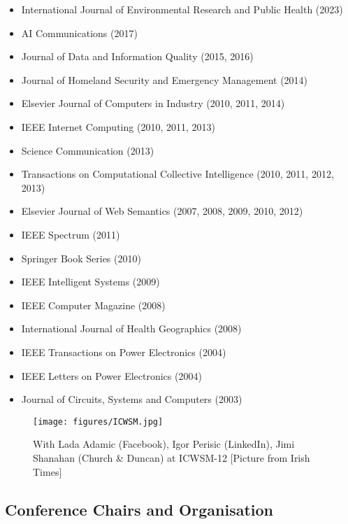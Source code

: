 \documentclass[10pt,a4paper]{res} %
\begin{document}
\begin{resume}
\begin{itemize} \itemsep -2pt
\item International Journal of Environmental Research and Public Health (2023)
\item AI Communications (2017)
\item Journal of Data and Information Quality (2015, 2016)
\item Journal of Homeland Security and Emergency Management (2014)
\item Elsevier Journal of Computers in Industry (2010, 2011, 2014)
\item IEEE Internet Computing (2010, 2011, 2013)
\item Science Communication (2013)
\item Transactions on Computational Collective Intelligence (2010, 2011, 2012, 2013)
\item Elsevier Journal of Web Semantics (2007, 2008, 2009, 2010, 2012)
\item IEEE Spectrum (2011)
\item Springer Book Series (2010)
\item IEEE Intelligent Systems (2009)
\item IEEE Computer Magazine (2008)
\item International Journal of Health Geographics (2008)
\item IEEE Transactions on Power Electronics (2004)
\item IEEE Letters on Power Electronics (2004)
\item Journal of Circuits, Systems and Computers (2003)
\end{itemize}

\begin{figure}[htbp]
\begin{center}
\texttt{[image: figures/ICWSM.jpg]}
\end{center}
\caption{With Lada Adamic (Facebook), Igor Perisic (LinkedIn), Jimi Shanahan (Church \& Duncan) at ICWSM-12 [Picture from Irish Times]}
\end{figure}

\subsection*{Conference Chairs and Organisation}


\end{resume}
\end{document}
